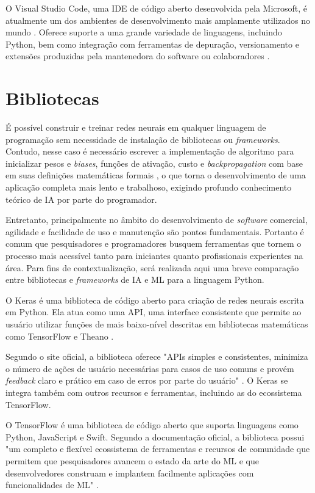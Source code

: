 O Visual Studio Code, uma IDE de código aberto desenvolvida pela Microsoft, é atualmente um dos ambientes de desenvolvimento mais amplamente utilizados no mundo \cite{so20}. Oferece suporte a uma grande variedade de linguagens, incluindo Python, bem como integração com ferramentas de depuração, versionamento e extensões produzidas pela mantenedora do software ou colaboradores \cite{microsoft20}.

\section{Bibliotecas} \label{biblios}
É possível construir e treinar redes neurais em qualquer linguagem de programação sem necessidade de instalação de bibliotecas ou \textit{frameworks}. Contudo, nesse caso é necessário escrever a implementação de algoritmo para inicializar pesos e \textit{biases}, funções de ativação, custo e \textit{backpropagation} com base em suas definições matemáticas formais \cite{peixeiro19}, o que torna o desenvolvimento de uma aplicação completa mais lento e trabalhoso, exigindo profundo conhecimento teórico de IA por parte do programador. 

Entretanto, principalmente no âmbito do desenvolvimento de \textit{software} comercial, agilidade e facilidade de uso e manutenção são pontos fundamentais. Portanto é comum que pesquisadores e programadores busquem ferramentas que tornem o processo mais acessível tanto para iniciantes quanto profissionais experientes na área. Para fins de contextualização, será realizada aqui uma breve comparação entre bibliotecas e \textit{frameworks} de IA e ML para a linguagem Python.

O Keras é uma biblioteca de código aberto para criação de redes neurais escrita em Python. Ela atua como uma API, uma interface consistente que permite ao usuário utilizar funções de mais baixo-nível descritas em bibliotecas matemáticas como TensorFlow e Theano \cite{brownlee19}. 

Segundo o site oficial, a biblioteca oferece "APIs simples e consistentes, minimiza o número de ações de usuário necessárias para casos de uso comuns e provém \textit{feedback} claro e prático em caso de erros por parte do usuário" . O Keras se integra também com outros recursos e ferramentas, incluindo as do ecossistema TensorFlow.

O TensorFlow é uma biblioteca de código aberto que suporta linguagens como Python, JavaScript e Swift. Segundo a documentação oficial, a biblioteca possui "um completo e flexível ecossistema de ferramentas e recursos de comunidade que permitem que pesquisadores avancem o estado da arte do ML e que desenvolvedores construam e implantem facilmente aplicações com funcionalidades de ML" . 

